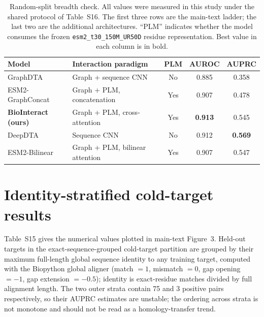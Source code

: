 \documentclass[11pt]{article}
\begin{document}
\begin{table}[H]
\centering
\small
\caption{Random-split breadth check. All values were measured in this study
under the shared protocol of Table~S16. The first three rows are the main-text
ladder; the last two are the additional architectures. ``PLM'' indicates
whether the model consumes the frozen \texttt{esm2\_t30\_150M\_UR50D} residue
representation. Best value in each column is in bold.}
\begin{tabular}{llccc}
\toprule
Model & Interaction paradigm & PLM & AUROC & AUPRC \\
\midrule
GraphDTA & Graph + sequence CNN & No & 0.885 & 0.358 \\
ESM2-GraphConcat & Graph + PLM, concatenation & Yes & 0.907 & 0.478 \\
\textbf{BioInteract (ours)} & Graph + PLM, cross-attention & Yes & \textbf{0.913} & 0.545 \\
DeepDTA & Sequence CNN & No & 0.912 & \textbf{0.569} \\
ESM2-Bilinear & Graph + PLM, bilinear attention & Yes & 0.907 & 0.547 \\
\bottomrule
\end{tabular}
\label{tab:breadth_si}
\end{table}

\clearpage
\section*{Identity-stratified cold-target results}

Table~S15 gives the numerical values plotted in main-text Figure~3. Held-out
targets in the exact-sequence-grouped cold-target partition are grouped by their
maximum full-length global sequence identity to any training target, computed
with the Biopython global aligner (match $=1$, mismatch $=0$, gap opening $=-1$,
gap extension $=-0.5$); identity is exact-residue matches divided by full
alignment length. The two outer strata contain 75 and 3 positive pairs
respectively, so their AUPRC estimates are unstable; the ordering across strata
is not monotone and should not be read as a homology-transfer trend.
\end{document}
